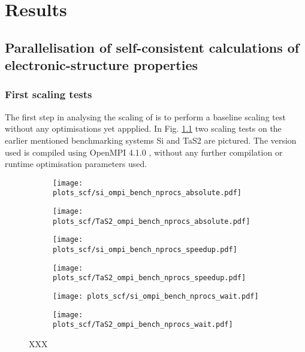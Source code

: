 \documentclass[main.tex]{subfiles}
\begin{document}
\chapter{Results}

\section{Parallelisation of self-consistent calculations of electronic-structure properties}

\subsection{First scaling tests}

The first step in analysing the scaling of \QE is to perform a baseline scaling test without any optimisations yet appplied. 
In Fig. \ref{fig:scaling_ompi_nprocs} two scaling tests on the earlier mentioned benchmarking systems Si and TaS2 are pictured. 
The \QE version used is compiled using OpenMPI 4.1.0 , without any further compilation or runtime optimisation parameters used.

\begin{figure}[htbp]
\begin{subfigure}[b]{0.3\textwidth}
    \centering
    \texttt{[image: plots\_scf/si\_ompi\_bench\_nprocs\_absolute.pdf]}
\end{subfigure}
\begin{subfigure}[b]{0.3\textwidth}
    \centering
    \texttt{[image: plots\_scf/TaS2\_ompi\_bench\_nprocs\_absolute.pdf]}
\end{subfigure}
\begin{subfigure}[b]{0.3\textwidth}
    \centering
    \texttt{[image: plots\_scf/si\_ompi\_bench\_nprocs\_speedup.pdf]}
\end{subfigure}
\begin{subfigure}[b]{0.3\textwidth}
    \centering
    \texttt{[image: plots\_scf/TaS2\_ompi\_bench\_nprocs\_speedup.pdf]}
\end{subfigure}
\begin{subfigure}[b]{0.3\textwidth}
    \centering
    \texttt{[image: plots\_scf/si\_ompi\_bench\_nprocs\_wait.pdf]}
\end{subfigure}
\begin{subfigure}[b]{0.3\textwidth}
    \centering
    \texttt{[image: plots\_scf/TaS2\_ompi\_bench\_nprocs\_wait.pdf]}
\end{subfigure}
\caption{XXX}
\label{fig:scaling_ompi_nprocs}
\end{figure}
\end{document}
